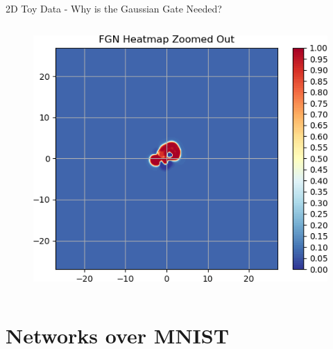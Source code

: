 \documentclass{beamer}
\begin{document}
\begin{frame}{2D Toy Data - Why is the Gaussian Gate Needed?}
\begin{columns}
    \begin{column}{.48\textwidth}
    \begin{figure}
        \centering
        \includegraphics[width=1.\textwidth]{images/2D-network-toy/no-gate-zoomed-out.png}
    \end{figure}
    \end{column}
    \end{columns}

\end{frame}


\section{Networks over MNIST}
\end{document}
